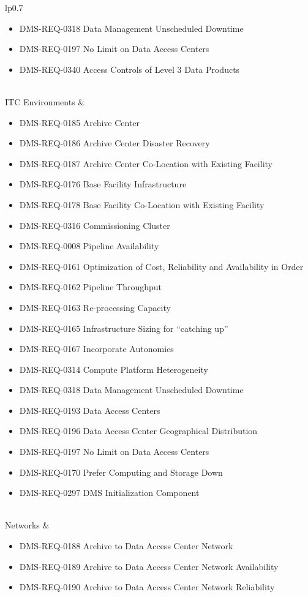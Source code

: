 \begin{xtabular}{lp{0.7\textwidth}}
\begin{itemize}
\item DMS-REQ-0318 Data Management Unscheduled Downtime
\item DMS-REQ-0197 No Limit on Data Access Centers
\item DMS-REQ-0340 Access Controls of Level 3 Data Products
\end{itemize} \\ \hline
ITC Environments &
\begin{itemize}
\item DMS-REQ-0185 Archive Center
\item DMS-REQ-0186 Archive Center Disaster Recovery
\item DMS-REQ-0187 Archive Center Co-Location with Existing Facility
\item DMS-REQ-0176 Base Facility Infrastructure
\item DMS-REQ-0178 Base Facility Co-Location with Existing Facility
\item DMS-REQ-0316 Commissioning Cluster
\item DMS-REQ-0008 Pipeline Availability
\item DMS-REQ-0161 Optimization of Cost, Reliability and Availability in Order
\item DMS-REQ-0162 Pipeline Throughput
\item DMS-REQ-0163 Re-processing Capacity
\item DMS-REQ-0165 Infrastructure Sizing for ``catching up''
\item DMS-REQ-0167 Incorporate Autonomics
\item DMS-REQ-0314 Compute Platform Heterogeneity
\item DMS-REQ-0318 Data Management Unscheduled Downtime
\item DMS-REQ-0193 Data Access Centers
\item DMS-REQ-0196 Data Access Center Geographical Distribution
\item DMS-REQ-0197 No Limit on Data Access Centers
\item DMS-REQ-0170 Prefer Computing and Storage Down
\item DMS-REQ-0297 DMS Initialization Component
\end{itemize} \\ \hline
Networks &
\begin{itemize}
\item DMS-REQ-0188 Archive to Data Access Center Network
\item DMS-REQ-0189 Archive to Data Access Center Network Availability
\item DMS-REQ-0190 Archive to Data Access Center Network Reliability

\end{itemize}
\end{xtabular}
